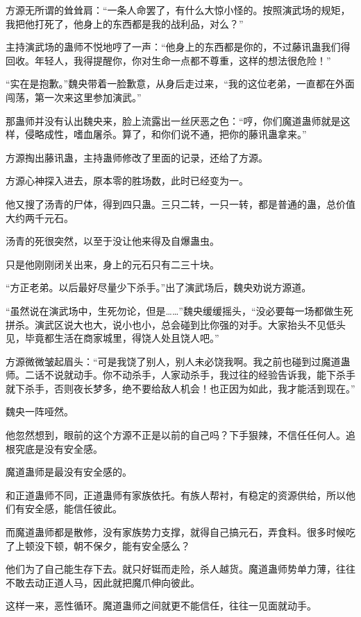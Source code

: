 \begin{this_body}
方源无所谓的耸耸肩：“一条人命罢了，有什么大惊小怪的。按照演武场的规矩，我把他打死了，他身上的东西都是我的战利品，对么？”

主持演武场的蛊师不悦地哼了一声：“他身上的东西都是你的，不过藤讯蛊我们得回收。年轻人，我得提醒你，你对生命一点都不尊重，这样的想法很危险！”

“实在是抱歉。”魏央带着一脸歉意，从身后走过来，“我的这位老弟，一直都在外面闯荡，第一次来这里参加演武。”

那蛊师并没有认出魏央来，脸上流露出一丝厌恶之色：“哼，你们魔道蛊师就是这样，侵略成性，嗜血屠杀。算了，和你们说不通，把你的藤讯蛊拿来。”

方源掏出藤讯蛊，主持蛊师修改了里面的记录，还给了方源。

方源心神探入进去，原本零的胜场数，此时已经变为一。

他又搜了汤青的尸体，得到四只蛊。三只二转，一只一转，都是普通的蛊，总价值大约两千元石。

汤青的死很突然，以至于没让他来得及自爆蛊虫。

只是他刚刚闭关出来，身上的元石只有二三十块。

“方正老弟。以后最好尽量少下杀手。”出了演武场后，魏央劝说方源道。

“虽然说在演武场中，生死勿论，但是……”魏央缓缓摇头，“没必要每一场都做生死拼杀。演武区说大也大，说小也小，总会碰到比你强的对手。大家抬头不见低头见，毕竟都生活在商家城里，得饶人处且饶人吧。”

方源微微皱起眉头：“可是我饶了别人，别人未必饶我啊。我之前也碰到过魔道蛊师。二话不说就动手。你不动杀手，人家动杀手，我过往的经验告诉我，能下杀手就下杀手，否则夜长梦多，绝不要给敌人机会！也正因为如此，我才能活到现在。”

魏央一阵哑然。

他忽然想到，眼前的这个方源不正是以前的自己吗？下手狠辣，不信任任何人。追根究底是没有安全感。

魔道蛊师是最没有安全感的。

和正道蛊师不同，正道蛊师有家族依托。有族人帮衬，有稳定的资源供给，所以他们有安全感，能信任彼此。

而魔道蛊师都是散修，没有家族势力支撑，就得自己搞元石，弄食料。很多时候吃了上顿没下顿，朝不保夕，能有安全感么？

他们为了自己能生存下去。就只好铤而走险，杀人越货。魔道蛊师势单力薄，往往不敢去动正道人马，因此就把魔爪伸向彼此。

这样一来，恶性循环。魔道蛊师之间就更不能信任，往往一见面就动手。


\end{this_body}
